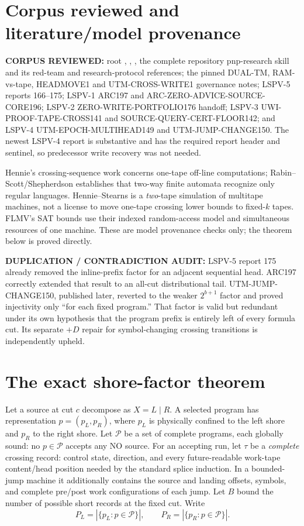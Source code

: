 \documentclass[11pt]{article}
\begin{document}
\section{Corpus reviewed and literature/model provenance}
\textbf{CORPUS REVIEWED:} root , ,
, the complete repository pnp-research skill and its red-team
and research-protocol references; the pinned DUAL-TM, RAM-vs-tape,
HEADMOVE1 and UTM-CROSS-WRITE1 governance notes; LSPV-5 reports 166--175;
LSPV-1 ARC197 and ARC-ZERO-ADVICE-SOURCE-CORE196; LSPV-2
ZERO-WRITE-PORTFOLIO176 handoff; LSPV-3 UWI-PROOF-TAPE-CROSS141 and
SOURCE-QUERY-CERT-FLOOR142; and LSPV-4 UTM-EPOCH-MULTIHEAD149 and
UTM-JUMP-CHANGE150.  The newest LSPV-4 report is substantive and has the
required report header and sentinel, so predecessor write recovery was not
needed.

Hennie's crossing-sequence work concerns one-tape off-line computations;
Rabin--Scott/Shepherdson establishes that two-way finite automata recognize
only regular languages.  Hennie--Stearns is a \emph{two}-tape simulation
of multitape machines, not a license to move one-tape crossing lower bounds
to fixed-$k$ tapes.  FLMV's SAT bounds use their indexed random-access
model and simultaneous resources of one machine.  These are model
provenance checks only; the theorem below is proved directly.

\textbf{DUPLICATION / CONTRADICTION AUDIT:} LSPV-5 report 175 already
removed the inline-prefix factor for an adjacent sequential head.  ARC197
correctly extended that result to an all-cut distributional tail.
UTM-JUMP-CHANGE150, published later, reverted to the weaker
$2^{b+1}$ factor and proved injectivity only ``for each fixed program.''
That factor is valid but redundant under its own hypothesis that the program
prefix is entirely left of every formula cut.  Its separate $+D$ repair for
symbol-changing crossing transitions is independently upheld.

\section{The exact shore-factor theorem}
Let a source at cut $c$ decompose as $X=L\mid R$.  A selected program has
representation $p=(p_L,p_R)$, where $p_L$ is physically confined to the
left shore and $p_R$ to the right shore.  Let $\mathcal P$ be a set of
complete programs, each globally sound: no $p\in\mathcal P$ accepts any
NO source.  For an accepting run, let $\tau$ be a \emph{complete} crossing
record: control state, direction, and every future-readable work-tape
content/head position needed by the standard splice induction.  In a
bounded-jump machine it additionally contains the source and landing
offsets, symbols, and complete pre/post work configurations of each jump.
Let $B$ bound the number of possible short records at the fixed cut.
Write
\[
 P_L=|\{p_L:p\in\mathcal P\}|,\qquad
 P_R=|\{p_R:p\in\mathcal P\}|.
\]
\end{document}
